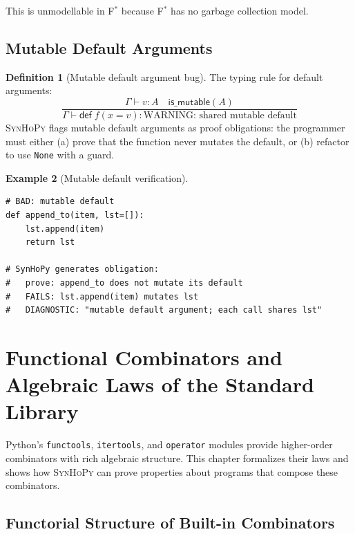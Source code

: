 \documentclass[11pt,a4paper]{report}
\theoremstyle{definition}
\newtheorem{definition}{Definition}[chapter]
\newtheorem{example}[definition]{Example}
\theoremstyle{plain}
\newcommand{\fstar}{F$^{*}$}
\newcommand{\synhopy}{\textsc{SynHoPy}}
\begin{document}
This is unmodellable in \fstar{} because \fstar{} has no garbage collection model.


\section{Mutable Default Arguments}

\begin{definition}[Mutable default argument bug]
The typing rule for default arguments:
\[
  \frac{
    \Gamma \vdash v : A \quad \mathsf{is\_mutable}(A)
  }{
    \Gamma \vdash \mathsf{def}\; f(x = v) : \text{WARNING: shared mutable default}
  }
\]
\synhopy{} flags mutable default arguments as proof obligations:
the programmer must either (a) prove that the function never mutates the default,
or (b) refactor to use \lstinline[style=python]{None} with a guard.
\end{definition}

\begin{example}[Mutable default verification]
\begin{lstlisting}[style=python]
# BAD: mutable default
def append_to(item, lst=[]):
    lst.append(item)
    return lst

# SynHoPy generates obligation:
#   prove: append_to does not mutate its default
#   FAILS: lst.append(item) mutates lst
#   DIAGNOSTIC: "mutable default argument; each call shares lst"
\end{lstlisting}
\end{example}



\chapter{Functional Combinators and Algebraic Laws of the Standard Library}
\label{ch:functional-combinators}

Python's \lstinline[style=python]{functools}, \lstinline[style=python]{itertools},
and \lstinline[style=python]{operator} modules provide higher-order combinators
with rich algebraic structure.  This chapter formalizes their laws and shows
how \synhopy{} can prove properties about programs that compose these combinators.

\section{Functorial Structure of Built-in Combinators}
\end{document}
